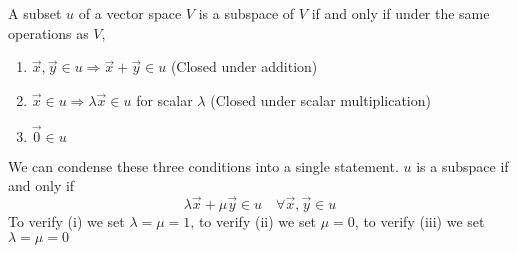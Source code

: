 \documentclass{article}
\numberwithin{equation}{section}
\begin{document}
\begin{thm}
    A subset $u$ of a vector space $V$ is a subspace of $V$ if and only if under the same operations as $V$,
    \begin{enumerate}
        \item $\vec{x}, \vec{y} \in u \Rightarrow \vec{x} + \vec{y} \in u$ \hspace*{\fill}(Closed under addition)
        \item $\vec{x} \in u \Rightarrow \lambda\vec{x}\in u$ for scalar $\lambda$ \hspace*{\fill}(Closed under scalar multiplication)
        \item $\vec{0} \in u$
    \end{enumerate}
    We can condense these three conditions into a single statement. $u$ is a subspace if and only if
    \begin{equation}\label{eq:2-32}
        \lambda \vec{x} + \mu \vec{y} \in u \quad \forall \vec{x}, \vec{y} \in u  
    \end{equation}
    To verify (i) we set $\lambda = \mu = 1$, to verify (ii) we set $\mu = 0$, to verify (iii) we set $\lambda = \mu = 0$
\end{thm}
\end{document}
